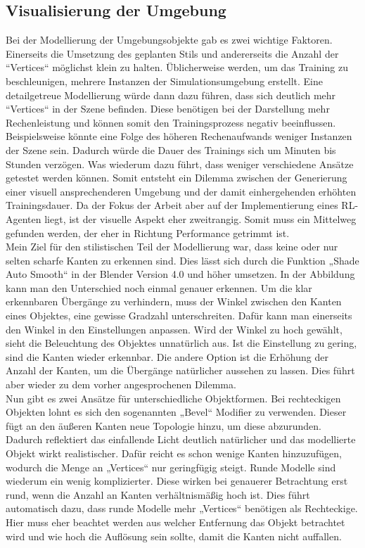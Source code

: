 \subsection{Visualisierung der Umgebung}
\label{vis_umgebung}
Bei der Modellierung der Umgebungsobjekte gab es zwei wichtige Faktoren. Einerseits die Umsetzung des geplanten Stils und andererseits die Anzahl der “Vertices“ möglichst klein zu halten. Üblicherweise werden, um das Training zu beschleunigen, mehrere Instanzen der Simulationsumgebung erstellt. Eine detailgetreue Modellierung würde dann dazu führen, dass sich deutlich mehr “Vertices“ in der Szene befinden. Diese benötigen bei der Darstellung mehr Rechenleistung und können somit den Trainingsprozess negativ beeinflussen. Beispielsweise könnte eine Folge des höheren Rechenaufwands weniger Instanzen der Szene sein. Dadurch würde die Dauer des Trainings sich um Minuten bis Stunden verzögen. Was wiederum dazu führt, dass weniger verschiedene Ansätze getestet werden können. Somit entsteht ein Dilemma zwischen der Generierung einer visuell ansprechenderen Umgebung und der damit einhergehenden erhöhten Trainingsdauer. Da der Fokus der Arbeit aber auf der Implementierung eines RL-Agenten liegt, ist der visuelle Aspekt eher zweitrangig. Somit muss ein Mittelweg gefunden werden, der eher in Richtung Performance getrimmt ist. 
\\
Mein Ziel für den stilistischen Teil der Modellierung war, dass keine oder nur selten scharfe Kanten zu erkennen sind. Dies lässt sich durch die Funktion „Shade Auto Smooth“ in der Blender Version 4.0 und höher umsetzen. In der Abbildung kann man den Unterschied noch einmal genauer erkennen. Um die klar erkennbaren Übergänge zu verhindern, muss der Winkel zwischen den Kanten eines Objektes, eine gewisse Gradzahl unterschreiten. Dafür kann man einerseits den Winkel in den Einstellungen anpassen. Wird der Winkel zu hoch gewählt, sieht die Beleuchtung des Objektes unnatürlich aus. Ist die Einstellung zu gering, sind die Kanten wieder erkennbar. Die andere Option ist die Erhöhung der Anzahl der Kanten, um die Übergänge natürlicher aussehen zu lassen. Dies führt aber wieder zu dem vorher angesprochenen Dilemma. 
\\
Nun gibt es zwei Ansätze für unterschiedliche Objektformen. Bei rechteckigen Objekten lohnt es sich den sogenannten „Bevel“ Modifier zu verwenden. Dieser fügt an den äußeren Kanten neue Topologie hinzu, um diese abzurunden. Dadurch reflektiert das einfallende Licht deutlich natürlicher und das modellierte Objekt wirkt realistischer. Dafür reicht es schon wenige Kanten hinzuzufügen, wodurch die Menge an „Vertices“ nur geringfügig steigt. Runde Modelle sind wiederum ein wenig komplizierter. Diese wirken bei genauerer Betrachtung erst rund, wenn die Anzahl an Kanten verhältnismäßig hoch ist. Dies führt automatisch dazu, dass runde Modelle mehr „Vertices“ benötigen als Rechteckige. Hier muss eher beachtet werden aus welcher Entfernung das Objekt betrachtet wird und wie hoch die Auflösung sein sollte, damit die Kanten nicht auffallen. 
